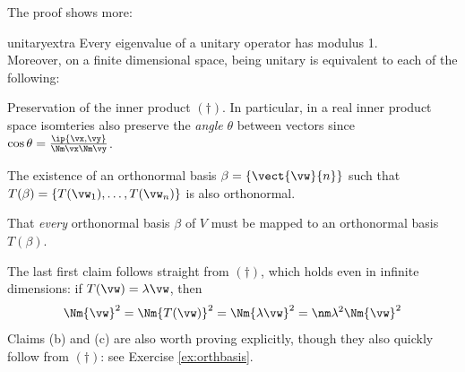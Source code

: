 The proof shows more:

\begin{cor}{}{unitaryextra}
Every eigenvalue of a unitary operator has modulus 1.\\[5pt]
Moreover, on a finite dimensional space, being unitary is equivalent to each of the following:
\begin{enumeratea}
 \item Preservation of the inner product $(\dag)$. In particular, in a real inner product space isomteries also preserve the \emph{angle} $\theta$ between vectors since $\cos\theta=\frac{\ip{\vx,\vy}}{\Nm\vx\Nm\vy}$.
 \item The existence of an orthonormal basis $\beta=\{\vect{\vw}{n}\}$ such that $T(\beta)=\{T(\vw_1),\ldots,T(\vw_n)\}$ is also orthonormal.
 \item That \emph{every} orthonormal basis $\beta$ of $V$ must be mapped to an orthonormal basis $T(\beta)$.
\end{enumeratea} 
\end{cor}

The last first claim follows straight from $(\dag)$, which holds even in infinite dimensions: if $T(\vw)=\lambda\vw$, then
\[\Nm{\vw}^2=\Nm{T(\vw)}^2=\Nm{\lambda\vw}^2=\nm\lambda^2\Nm{\vw}^2\]
Claims (b) and (c) are also worth proving explicitly, though they also quickly follow from $(\dag)$: see Exercise \ref{ex:orthbasis}.


